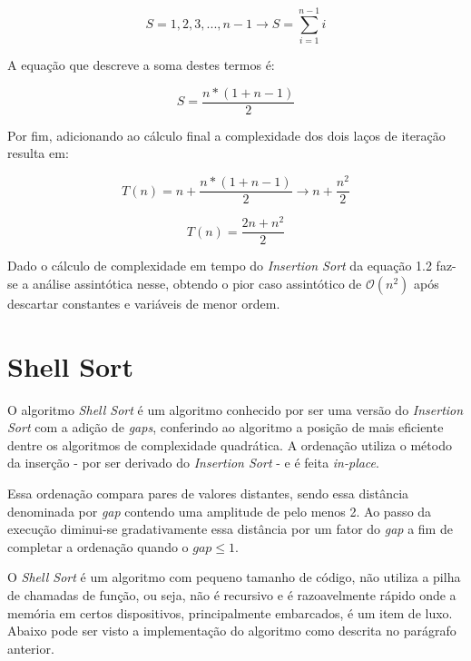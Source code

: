 \documentclass[a4paper, 12pt]{report}
\begin{document}
\begin{displaymath}
S = 1, 2, 3, ..., n-1 \rightarrow S = \sum_{i = 1}^{n-1} i
\end{displaymath}

A equação que descreve a soma destes termos é:

\begin{equation}
S = \frac{n*(1 + n-1)}{2}
\end{equation}

Por fim, adicionando ao cálculo final a complexidade dos dois laços de iteração
resulta em:

\begin{displaymath}
T(n) = n + \frac{n*(1+n-1)}{2} \rightarrow
n + \frac{n^2}{2}
\end{displaymath}

\begin{equation}
T(n) = \frac{2n + n^2}{2}
\end{equation}

Dado o cálculo de complexidade em tempo do \emph{Insertion Sort} da equação 1.2
faz-se a análise assintótica nesse, obtendo o pior caso assintótico de
$\mathcal{O}(n^2)$ após descartar constantes e variáveis de menor ordem.

\section{Shell Sort}
\label{sec-2-1-4}
O algoritmo \emph{Shell Sort} é um algoritmo conhecido por ser uma versão do
\emph{Insertion Sort} com a adição de \emph{gaps}, conferindo ao algoritmo a posição de
mais eficiente dentre os algoritmos de complexidade quadrática. A ordenação
utiliza o método da inserção - por ser derivado do \emph{Insertion Sort} - e é
feita \emph{in-place}.

Essa ordenação compara pares de valores distantes, sendo essa distância
denominada por \emph{gap} contendo uma amplitude de pelo menos 2. Ao passo da
execução diminui-se gradativamente essa distância por um fator do \emph{gap} a fim
de completar a ordenação quando o $gap \leq 1$.

O \emph{Shell Sort} é um algoritmo com pequeno tamanho de código, não utiliza a
pilha de chamadas de função, ou seja, não é recursivo e é razoavelmente rápido
onde a memória em certos dispositivos, principalmente embarcados, é um item
de luxo. Abaixo pode ser visto a implementação do algoritmo como descrita no
parágrafo anterior.
\end{document}
